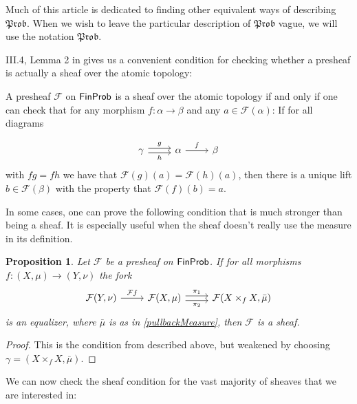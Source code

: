 \documentclass[a4paper]{amsproc}
\theoremstyle{plain}
\newtheorem{proposition}[theorem]{Proposition}
\theoremstyle{definition}
\theoremstyle{remark}
\numberwithin{equation}{section}
\newcommand{\FinProb}{\textup{\textsf{FinProb}}}
\newcommand{\Prob}{\mathfrak{Prob}}
\begin{document}
Much of this article is dedicated to finding other equivalent ways of describing $\Prob$. When we wish to leave the particular description of $\Prob$ vague, we will use the notation $\Prob$.

III.4, Lemma 2 in \cite{sheaves_geometry_logic} gives us a convenient condition for checking whether a presheaf is actually a sheaf over the atomic topology:

A presheaf $\mathcal{F}$ on $\FinProb$ is a sheaf over the atomic topology if and only if one can check that for any morphism $f: \alpha \to \beta$ and any $a \in \mathcal{F}(\alpha)$: If for all diagrams

\[
\begin{tikzcd}
\gamma \arrow[r, "g", shift left] \arrow[r, "h"', shift right] & \alpha \arrow[r, "f"] & \beta
\end{tikzcd}
\]
with $f g = f h$ we have that $\mathcal{F}(g)(a) = \mathcal{F}(h)(a)$, then there is a unique lift $b \in \mathcal{F}(\beta)$ with the property that $\mathcal{F}(f)(b) = a$.

In some cases, one can prove the following condition that is much stronger than being a sheaf. It is especially useful when the sheaf doesn't really use the measure in its definition.

\begin{proposition} \label{sheafConditionWeak}
Let $\mathcal{F}$ be a presheaf on $\FinProb$. If for all morphisms $f: (X,\mu) \to (Y,\nu)$ the fork
\[
\begin{tikzcd} \mathcal{F} (Y,\nu) \arrow[r, "\mathcal{F}f"] & \mathcal{F} (X,\mu) \arrow[r, "\pi_1", shift left] \arrow[r, "\pi_2"', shift right] & \mathcal{F} (X \times_f X,\bar{\mu})
\end{tikzcd}
\]
is an equalizer, where $\bar{\mu}$ is as in \ref{pullbackMeasure}, then $\mathcal{F}$ is a sheaf.
\end{proposition}
\begin{proof}
This is the condition from \cite{sheaves_geometry_logic} described above, but weakened by choosing $\gamma = (X \times_f X,\bar{\mu})$.
\end{proof}

We can now check the sheaf condition for the vast majority of sheaves that we are interested in:
\end{document}
